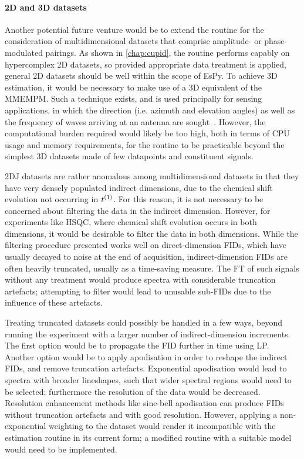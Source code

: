 \paragraph{\ac{2D} and \ac{3D} datasets}
Another potential future venture would be to extend the routine for the
consideration of multidimensional datasets that comprise amplitude- or
phase-modulated pairings.
As shown in \cref{chap:cupid}, the routine performs capably on
hypercomplex \ac{2D} datasets, so provided appropriate data treatment is
applied, general \ac{2D} datasets should be well within the scope of
\ac{EsPy}.
To achieve \ac{3D} estimation, it would be necessary to
make use of a \ac{3D} equivalent of the \ac{MMEMPM}. Such a technique exists,
and is used principally for sensing applications, in which the direction (i.e.
azimuth and elevation angles) as well as the frequency of waves arriving at an
antenna are sought~\cite{Yilmazer2006}.
However, the computational burden required would likely be too high, both
in terms of \ac{CPU} usage and memory requirements, for the routine to be
practicable beyond the simplest \ac{3D} datasets made of few datapoints and
constituent signals.

\ac{2DJ} datasets are rather anomalous among multidimensional datasets in
that they have very densely populated indirect dimensions, due to the chemical
shift evolution not occurring in $t^{(1)}$. For this reason, it
is not necessary to be concerned about filtering the data in the indirect
dimension. However, for experiments like \ac{HSQC}, where chemical shift
evolution occurs in both dimensions, it would be desirable to filter
the data in both dimensions.
While the filtering procedure presented works well on direct-dimension
\acp{FID}, which have usually decayed to noise at the end
of acquisition, indirect-dimension \acp{FID} are often heavily truncated,
usually as a time-saving measure. The \ac{FT} of such signals without any
treatment would produce spectra with considerable truncation artefacts;
attempting to filter would lead to unusable sub-\acp{FID} due to the influence
of these artefacts.

Treating truncated datasets could possibly be handled in a few ways,
beyond running the experiment with a larger number of indirect-dimension
increments. The first option would be to propagate the \ac{FID} further in time
using \ac{LP}. Another option would be to apply apodisation in order to reshape
the indirect \acp{FID}, and remove truncation artefacts.
Exponential apodisation would lead to spectra with broader lineshapes, such
that wider spectral regions would need to be selected; furthermore the
resolution of the data would be decreased.
Resolution enhancement methods like sine-bell apodisation can
produce \acp{FID} without truncation artefacts and with good resolution.
However, applying a non-exponential weighting to the
dataset would render it incompatible with the estimation routine in its
current form; a modified routine with a suitable model would need to
be implemented.

